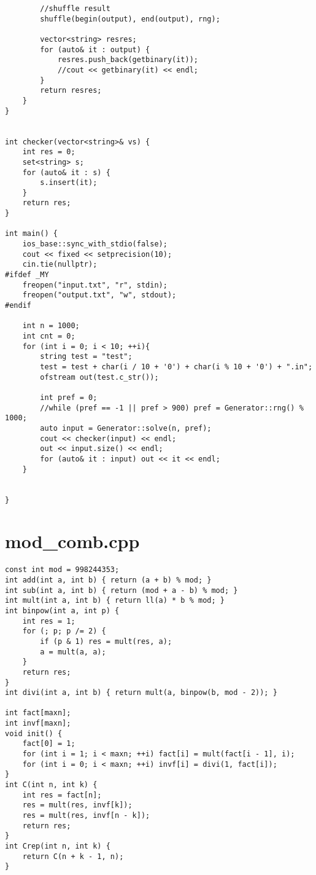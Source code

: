 \documentclass[a4paper,12pt]{report}
\begin{document}
\begin{lstlisting}
        //shuffle result
        shuffle(begin(output), end(output), rng);

        vector<string> resres;
        for (auto& it : output) {
            resres.push_back(getbinary(it));
            //cout << getbinary(it) << endl;
        }
        return resres;
    }
}


int checker(vector<string>& vs) {
    int res = 0;
    set<string> s;
    for (auto& it : s) {
        s.insert(it);
    }
    return res;
}

int main() {
    ios_base::sync_with_stdio(false);
    cout << fixed << setprecision(10);
    cin.tie(nullptr);
#ifdef _MY
    freopen("input.txt", "r", stdin);
    freopen("output.txt", "w", stdout);
#endif

    int n = 1000;
    int cnt = 0;
    for (int i = 0; i < 10; ++i){
        string test = "test";
        test = test + char(i / 10 + '0') + char(i % 10 + '0') + ".in";
        ofstream out(test.c_str());

        int pref = 0;
        //while (pref == -1 || pref > 900) pref = Generator::rng() % 1000;
        auto input = Generator::solve(n, pref);
        cout << checker(input) << endl;
        out << input.size() << endl;
        for (auto& it : input) out << it << endl;
    }


}

\end{lstlisting}


\section{mod_comb.cpp}
\begin{lstlisting}
const int mod = 998244353;
int add(int a, int b) { return (a + b) % mod; }
int sub(int a, int b) { return (mod + a - b) % mod; }
int mult(int a, int b) { return ll(a) * b % mod; }
int binpow(int a, int p) {
    int res = 1;
    for (; p; p /= 2) {
        if (p & 1) res = mult(res, a);
        a = mult(a, a);
    }
    return res;
}
int divi(int a, int b) { return mult(a, binpow(b, mod - 2)); }

int fact[maxn];
int invf[maxn];
void init() {
    fact[0] = 1;
    for (int i = 1; i < maxn; ++i) fact[i] = mult(fact[i - 1], i);
    for (int i = 0; i < maxn; ++i) invf[i] = divi(1, fact[i]);
}
int C(int n, int k) {
    int res = fact[n];
    res = mult(res, invf[k]);
    res = mult(res, invf[n - k]);
    return res;
}
int Crep(int n, int k) {
    return C(n + k - 1, n);
}
\end{lstlisting}
\end{document}
